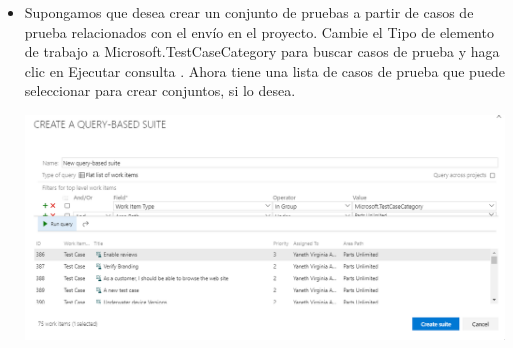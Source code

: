 \begin{itemize}
\begin{center}
\end{center}
\item Supongamos que desea crear un conjunto de pruebas a partir de casos de prueba relacionados con el envío en el proyecto. Cambie el Tipo de elemento de trabajo a Microsoft.TestCaseCategory para buscar casos de prueba y haga clic en Ejecutar consulta . Ahora tiene una lista de casos de prueba que puede seleccionar para crear conjuntos, si lo desea.
\begin{center}
\includegraphics[width=\columnwidth]{images/18}\newline
\end{center}


\end{itemize}
